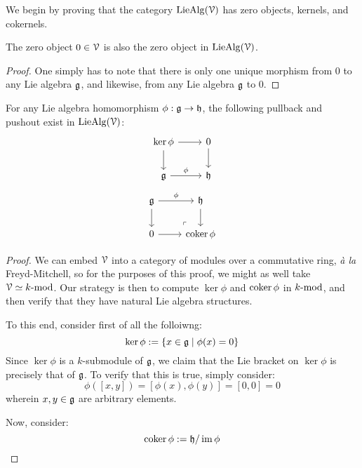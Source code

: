         We begin by proving that the category $\Lie\Alg(\calV)$ has zero objects, kernels, and cokernels.
        \begin{proposition} \label{prop: zero_lie_algebra}
            The zero object $0 \in \calV$ is also the zero object in $\Lie\Alg(\calV)$.
        \end{proposition}
            \begin{proof}
                One simply has to note that there is only one unique morphism from $0$ to any Lie algebra $\g$, and likewise, from any Lie algebra $\g$ to $0$. 
            \end{proof}
            
        \begin{proposition} \label{prop: (co)kernels_of_lie_algebra_homomorphisms}
            For any Lie algebra homomorphism $\phi: \g \to \h$, the following pullback and pushout exist in $\Lie\Alg(\calV)$:
                $$
                    \begin{tikzcd}
                    	{\ker \phi} & 0 \\
                    	\g & \h
                    	\arrow["\phi", from=2-1, to=2-2]
                    	\arrow[from=1-1, to=2-1]
                    	\arrow[from=1-1, to=1-2]
                    	\arrow[from=1-2, to=2-2]
                    \end{tikzcd}
                $$
                $$
                    \begin{tikzcd}
                    	\g & \h \\
                    	0 & {\coker \phi}
                    	\arrow["\phi", from=1-1, to=1-2]
                    	\arrow[from=1-1, to=2-1]
                    	\arrow[from=2-1, to=2-2]
                    	\arrow[from=1-2, to=2-2]
                    	\arrow["\lrcorner"{anchor=center, pos=0.125, rotate=180}, draw=none, from=2-2, to=1-1]
                    \end{tikzcd}
                $$
        \end{proposition}
            \begin{proof}
                We can embed $\calV$ into a category of modules over a commutative ring, \textit{\`a la} Freyd-Mitchell, so for the purposes of this proof, we might as well take $\calV \cong k\mod$. Our strategy is then to compute $\ker \phi$ and $\coker \phi$ in $k\mod$, and then verify that they have natural Lie algebra structures. 
                
                To this end, consider first of all the folloiwng:
                    $$\ker \phi := \{x \in \g \mid \phi(x) = 0\}$$
                Since $\ker \phi$ is a $k$-submodule of $\g$, we claim that the Lie bracket on $\ker \phi$ is precisely that of $\g$. To verify that this is true, simply consider:
                    $$\phi([x, y]) = [\phi(x), \phi(y)] = [0, 0] = 0$$
                wherein $x, y \in \g$ are arbitrary elements. 
                
                Now, consider:
                    $$\coker \phi := \h/\im\phi$$
            \end{proof}
        
